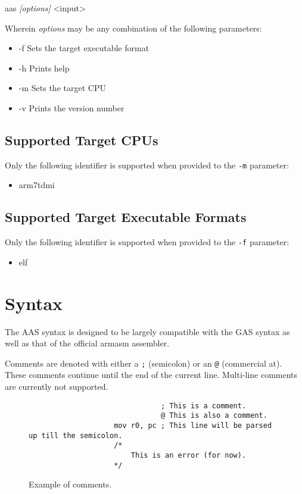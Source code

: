 \documentclass[a4paper]{article}
\begin{document}
		\begin{center}
			\ttfamily
			aas \textit{[options]} <input>
		\end{center}

		Wherein \textit{options} may be any combination of the following parameters:

		\begin{itemize}
			\item -f\quad{} Sets the target executable format
			\item -h\quad{} Prints help
			\item -m\quad{} Sets the target CPU
			\item -v\quad{} Prints the version number
		\end{itemize}

		\subsection{Supported Target CPUs}
			Only the following identifier is supported when provided to the \texttt{-m} parameter:

			\begin{itemize}
				\item arm7tdmi
			\end{itemize}

		\subsection{Supported Target Executable Formats}
			Only the following identifier is supported when provided to the \texttt{-f} parameter:

			\begin{itemize}
				\item elf
			\end{itemize}

	\clearpage
	\section{Syntax}
		The AAS syntax is designed to be largely compatible with the GAS syntax as well as that of the official armasm assembler.

		Comments are denoted with either a \texttt{;} (semicolon) or an \texttt{@} (commercial at). These comments continue until the end of the current line. Multi-line comments are currently not supported.

		\begin{figure}[h]
			\centering

			\caption{Example of comments.}
			\label{fig:comments}
			\begin{varwidth}{\linewidth}
				\begin{verbatim}
					           ; This is a comment.
					           @ This is also a comment.
					mov r0, pc ; This line will be parsed up till the semicolon.
					/*
					    This is an error (for now).
					*/
				\end{verbatim}
			\end{varwidth}
		\end{figure}
\end{document}
